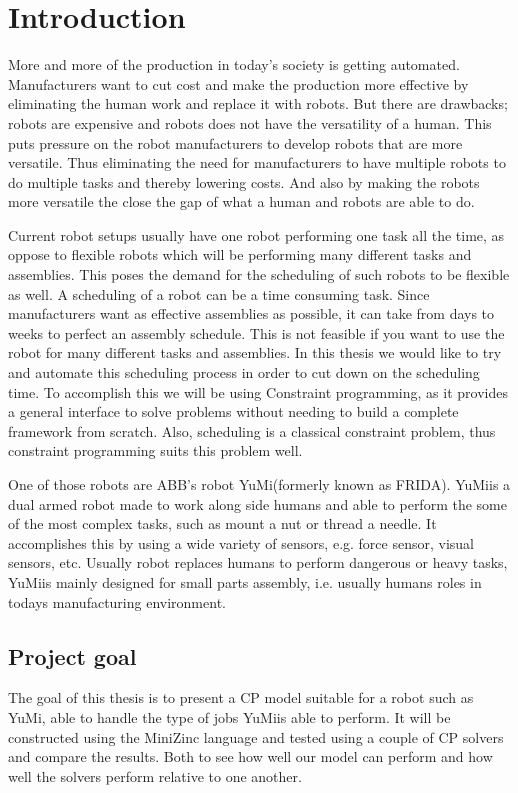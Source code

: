 \chapter{Introduction} 

More and more of the production in today's society is getting automated. Manufacturers want to cut cost and make the production more effective by eliminating the human work and replace it with robots. But there are drawbacks; robots are expensive and robots does not have the versatility of a human. This puts pressure on the robot manufacturers to develop robots that are more versatile. Thus eliminating the need for manufacturers to have multiple robots to do multiple tasks and thereby lowering costs. And also by making the robots more versatile the close the gap of what a human and robots are able to do.

Current robot setups usually have one robot performing one task all the time, as oppose to flexible robots which will be performing many different tasks and assemblies. This poses the demand for the scheduling of such robots to be flexible as well. A scheduling of a robot can be a time consuming task. Since manufacturers want as effective assemblies as possible, it can take from days to weeks to perfect an assembly schedule. This is not feasible if you want to use the robot for many different tasks and assemblies. In this thesis we would like to try and automate this scheduling process in order to cut down on the scheduling time. To accomplish this we will be using Constraint programming, as it provides a general interface to solve problems without needing to build a complete framework from scratch. Also, scheduling is a classical constraint problem, thus constraint programming suits this problem well.

One of those robots are ABB's robot YuMi\textsuperscript\textregistered(formerly known as FRIDA). YuMi\textsuperscript\textregistered is a dual armed robot made to work along side humans and able to perform the some of the most complex tasks, such as mount a nut or thread a needle.\cite{_yumi_} It accomplishes this by using a wide variety of sensors, e.g. force sensor, visual sensors, etc. Usually robot replaces humans to perform dangerous or heavy tasks, YuMi\textsuperscript\textregistered is mainly designed for small parts assembly, i.e. usually humans roles in todays manufacturing environment.



\section{Project goal}
The goal of this thesis is to present a CP model suitable for a robot such as YuMi\textsuperscript\textregistered, able to handle the type of jobs YuMi\textsuperscript\textregistered is able to perform. It will be constructed using the MiniZinc language and tested using a couple of CP solvers and compare the results. Both to see how well our model can perform and how well the solvers perform relative to one another.

